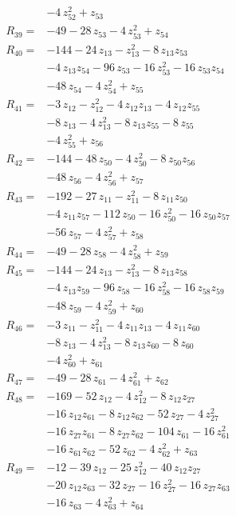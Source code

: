 \begin{align*}
&-4\,z_{52}^{2} +z_{53}\\[2pt]
R_{39}={}&-49 -28\,z_{53} -4\,z_{53}^{2} +z_{54}\\[2pt]
R_{40}={}&-144 -24\,z_{13} -z_{13}^{2} -8\,z_{13}z_{53}\\
&-4\,z_{13}z_{54} -96\,z_{53} -16\,z_{53}^{2} -16\,z_{53}z_{54}\\
&-48\,z_{54} -4\,z_{54}^{2} +z_{55}\\[2pt]
R_{41}={}&-3\,z_{12} -z_{12}^{2} -4\,z_{12}z_{13} -4\,z_{12}z_{55}\\
&-8\,z_{13} -4\,z_{13}^{2} -8\,z_{13}z_{55} -8\,z_{55}\\
&-4\,z_{55}^{2} +z_{56}\\[2pt]
R_{42}={}&-144 -48\,z_{50} -4\,z_{50}^{2} -8\,z_{50}z_{56}\\
&-48\,z_{56} -4\,z_{56}^{2} +z_{57}\\[2pt]
R_{43}={}&-192 -27\,z_{11} -z_{11}^{2} -8\,z_{11}z_{50}\\
&-4\,z_{11}z_{57} -112\,z_{50} -16\,z_{50}^{2} -16\,z_{50}z_{57}\\
&-56\,z_{57} -4\,z_{57}^{2} +z_{58}\\[2pt]
R_{44}={}&-49 -28\,z_{58} -4\,z_{58}^{2} +z_{59}\\[2pt]
R_{45}={}&-144 -24\,z_{13} -z_{13}^{2} -8\,z_{13}z_{58}\\
&-4\,z_{13}z_{59} -96\,z_{58} -16\,z_{58}^{2} -16\,z_{58}z_{59}\\
&-48\,z_{59} -4\,z_{59}^{2} +z_{60}\\[2pt]
R_{46}={}&-3\,z_{11} -z_{11}^{2} -4\,z_{11}z_{13} -4\,z_{11}z_{60}\\
&-8\,z_{13} -4\,z_{13}^{2} -8\,z_{13}z_{60} -8\,z_{60}\\
&-4\,z_{60}^{2} +z_{61}\\[2pt]
R_{47}={}&-49 -28\,z_{61} -4\,z_{61}^{2} +z_{62}\\[2pt]
R_{48}={}&-169 -52\,z_{12} -4\,z_{12}^{2} -8\,z_{12}z_{27}\\
&-16\,z_{12}z_{61} -8\,z_{12}z_{62} -52\,z_{27} -4\,z_{27}^{2}\\
&-16\,z_{27}z_{61} -8\,z_{27}z_{62} -104\,z_{61} -16\,z_{61}^{2}\\
&-16\,z_{61}z_{62} -52\,z_{62} -4\,z_{62}^{2} +z_{63}\\[2pt]
R_{49}={}&-12 -39\,z_{12} -25\,z_{12}^{2} -40\,z_{12}z_{27}\\
&-20\,z_{12}z_{63} -32\,z_{27} -16\,z_{27}^{2} -16\,z_{27}z_{63}\\
&-16\,z_{63} -4\,z_{63}^{2} +z_{64}\\[2pt]

\end{align*}
